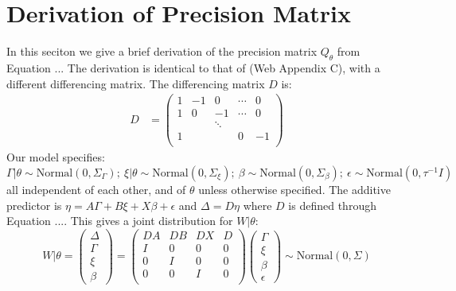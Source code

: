 \documentclass[]{article}
\begin{document}
\newpage




\appendix

\section{Derivation of Precision Matrix}

In this seciton we give a brief derivation of the precision matrix $Q_{\theta}$ from Equation ... The derivation is identical to that of \citet{casecross} (Web Appendix C), with a different differencing matrix. The differencing matrix $D$ is:
\begin{equation}\begin{aligned}\label{eqn:D2}
D &= \begin{pmatrix}
1 & -1 & 0 & \cdots & 0 \\
1 & 0 & -1 & \cdots & 0 \\
  &    & \ddots &   &   \\
1 &    &       & 0 & -1 \\
\end{pmatrix}
\end{aligned}\end{equation}
Our model specifies:
\begin{equation*}
\Gamma|\theta \sim \text{Normal}\left( 0,\Sigma_{\Gamma}\right); \ \xi|\theta \sim \text{Normal}\left( 0,\Sigma_{\xi}\right); \ \beta \sim \text{Normal}\left( 0,\Sigma_{\beta}\right); \ \epsilon \sim \text{Normal}\left( 0,\tau^{-1}I\right)
\end{equation*}
all independent of each other, and of $\theta$ unless otherwise specified. The additive predictor is $\eta = A\Gamma + B\xi + X\beta + \epsilon$ and $\Delta = D\eta$ where $D$ is defined through Equation .... This gives a joint distribution for $W|\theta$:
\begin{equation*}
W|\theta = \begin{pmatrix} \Delta \\ \Gamma \\ \xi \\\beta \end{pmatrix} = \begin{pmatrix} DA & DB & DX & D \\ I & 0 & 0 & 0 \\ 0 & I & 0 & 0 \\ 0 & 0 & I & 0 \\ \end{pmatrix}\begin{pmatrix}\Gamma\\ \xi \\ \beta \\ \epsilon \end{pmatrix} 
\sim \text{Normal}\left( 0,\Sigma\right)
\end{equation*}
\end{document}
